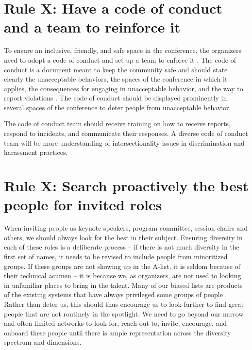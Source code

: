 \documentclass[10pt,letterpaper]{article}
\begin{document}
\section{Rule X: Have a code of conduct and a team to reinforce it}

To ensure an inclusive, friendly, and safe space in the conference, the organizers need to adopt a code of conduct and set up a team to enforce it \cite{favaro_your_2016}. The code of conduct is a document meant to keep the community safe and should state clearly the unacceptable behaviors, the spaces of the conference in which it applies, the consequences for engaging in unacceptable behavior, and the way to report violations \cite{aurora_how_2018}.%
The code of conduct should be displayed prominently in several spaces of the conference to deter people from unacceptable behavior.

The code of conduct team should receive training on how to receive reports, respond to incidents, and communicate their responses. A diverse code of conduct team will be more understanding of intersectionality issues in discrimination and harassment practices. 


\section{Rule X: Search proactively the best people for invited roles}

When inviting people as keynote speakers, program committee, session chairs and others, we should always look for the best in their subject. Ensuring diversity in each of these roles is a deliberate process -- if there is not much diversity in the first set of names, it needs to be revised to include people from minoritized groups. If these groups are not showing up in the A-list, it is seldom because of their technical acumen -- it is because we, as organizers, are not used to looking in unfamiliar places to bring in the talent.  Many of our biased lists are products of the existing systems that have always privileged some groups of people \cite{dwyer_notice_2021, sarabipour_evaluating_2020}. Rather than deter us, this should thus encourage us to look further to find great people that are not routinely in the spotlight. We need to go beyond our narrow and often limited networks to look for, reach out to, invite, encourage, and onboard these people until there is ample representation across the diversity spectrum and dimensions. 
\end{document}
